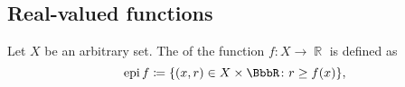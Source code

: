 \subsection{Real-valued functions}\label{subsec:real_valued_functions}

\begin{definition}\label{def:epigraph}
  Let \( X \) be an arbitrary set. The  of the function \( f: X \to \BbbR \) is defined as
  \begin{equation*}
    \epi f \coloneqq \{ (x, r) \in X \times \BbbR \colon r \geq f(x) \},
  \end{equation*}
\end{definition}
